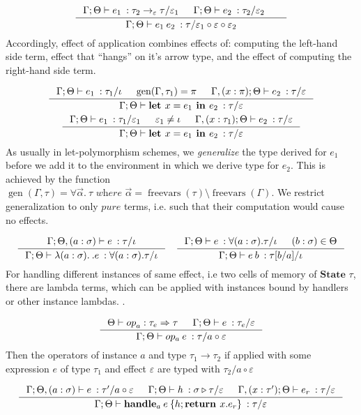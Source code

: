 \documentclass[declaration,shortabstract]{iithesis}
\theoremstyle{definition} \newtheorem{definition}{Definition}[section]
\newcommand{\types}[4][\Gamma;\Theta]{\ensuremath{{{#1} \vdash {#2} \: : {#3}/{#4}}}}
\newcommand{\arrow}[3]{{#1}\rightarrow_{#2}{#3}}
\newcommand{\lam}[1][x]{\ensuremath{\lambda #1.\:}}
\newcommand{\optypes}[5][\Theta]{\ensuremath{{#1}\vdash{#2}_{#3} : {#4} \Rightarrow {#5}}}
\newcommand{\ops}[2]{\optypes{op}{a}{#1}{#2}}
\begin{document}
$$
\inference{
    \types{e_1}{\arrow{\tau_2}{\varepsilon}{\tau}}{\varepsilon_1} &
    \types{e_2}{\tau_2}{\varepsilon_2} &
}{
    \types{e_1\:e_2}{\tau}{\varepsilon_1 \circ \varepsilon \circ \varepsilon_2}
}
$$
Accordingly, effect of application combines effects of: computing the left-hand side term,
effect that ``hangs'' on it's arrow type, and the effect of computing the right-hand side term.

\begin{gather*}
\begin{gathered}
\inference{
    \types{e_1}{\tau_1}{\iota} &
    \operatorname{gen}(\Gamma, \tau_1) = \pi &
    \types[\Gamma,(x:\pi);\Theta]{e_2}{\tau}{\varepsilon}
}{
    \types{\textbf{let } x = e_1 \textbf{ in } e_2}{\tau}{\varepsilon}
}
\\
\inference{
    \types{e_1}{\tau_1}{\varepsilon_1} & 
    \varepsilon_1 \neq \iota & 
    \types[\Gamma,(x:\tau_1);\Theta]{e_2}{\tau}{\varepsilon}
}{
    \types{\textbf{let } x = e_1 \textbf{ in } e_2}{\tau}{\varepsilon}
}
\end{gathered}
\end{gather*}
As usually in let-polymorphism schemes, we \textit{generalize} the type derived for $e_1$ before
we add it to the environment in which we derive type for $e_2$.
This is achieved by the function
$\operatorname{gen}(\Gamma, \tau) = \forall \vec\alpha.\:\tau \textit{ where }
\vec\alpha = \operatorname{freevars}(\tau) \setminus \operatorname{freevars}(\Gamma)$.
We restrict generalization to only $pure$ terms,
i.e. such that their computation would cause no effects.

$$
\inference{
    \types[\Gamma; \Theta, (a : \sigma)]{e}{\tau}{\iota}
}{
    \types{\lam[(a : \sigma)]. e}{\forall (a : \sigma) . \tau}{\iota}
}
\quad
\inference{
    \types{e}{\forall (a : \sigma) . \tau}{\iota} & (b:\sigma) \in \Theta
}{
    \types{e\:b}{\tau[b/a]}{\iota}
}
$$
For handling different instances of same effect, i.e two cells of memory of $\textbf{State }\tau$,
there are lambda terms, which can be applied with instances bound by handlers or other instance lambdas.
.

$$
\inference{
    \ops{\tau_e}{\tau} &
    \types{e}{\tau_e}{\varepsilon} 
}{
    \types{op_a \: e}{\tau}{a \circ \varepsilon}
}
$$
Then the operators of instance $a$ and type $\tau_1 \rightarrow \tau_2$ if applied with
some expression $e$ of type $\tau_1$ and effect $\varepsilon$ are typed with $\tau_2 /{ a \circ \varepsilon}$ 

$$
 \inference{
    \types[\Gamma;\Theta,(a:\sigma)]{e}{\tau'}{a \circ \varepsilon} &
    \types{h}{\sigma \triangleright \tau}{\varepsilon} &
    \types[\Gamma,(x:\tau');\Theta]{e_r}{\tau}{\varepsilon}
}{
    \types{\textbf{handle}_a \: e\: \{h;\textbf{return } x. e_r\}}{\tau}{\varepsilon}
}
$$
\end{document}

